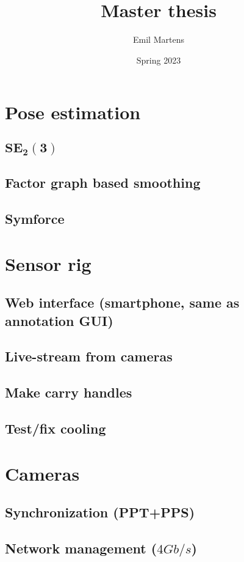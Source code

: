 \documentclass{article}
\title{Master thesis}
\author{Emil Martens}
\date{Spring 2023}
\begin{document}
\maketitle

\section{Pose estimation}
\subsection{$\mathbf{SE_2(3)}$}
\subsection{Factor graph based smoothing}
\subsection{Symforce}

\section{Sensor rig}
\subsection{Web interface (smartphone, same as annotation GUI)}
\subsection{Live-stream from cameras}
\subsection{Make carry handles}
\subsection{Test/fix cooling}
\usepackage{Camera mounts}


\section{Cameras}
\subsection{Synchronization (PPT+PPS)}
\subsection{Network management ($4Gb/s$)}
\end{document}
